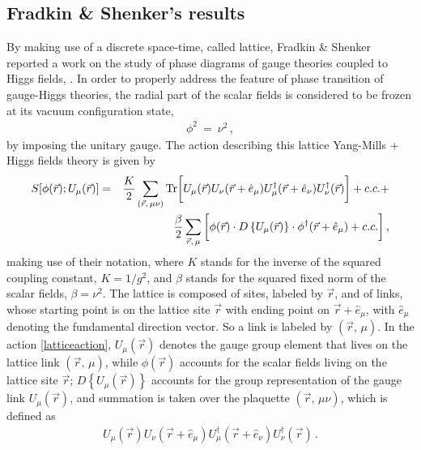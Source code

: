 \subsection{Fradkin \& Shenker's results}
\label{FSresults}


By making use of a discrete space-time, called lattice, Fradkin \& Shenker reported a work on
the study of phase diagrams of gauge theories coupled to Higgs fields, \cite{Fradkin:1978dv}.
%
In order to properly address the feature of phase transition of gauge-Higgs theories, the
radial part of the scalar fields is considered to be frozen at its vacuum configuration state,
\begin{eqnarray}
{\phi}^{2} ~=~ \nu^2\,,
\label{untgauge}
\end{eqnarray}
by imposing the unitary gauge. The action describing this lattice Yang-Mills + Higgs fields
theory is given by
\begin{eqnarray}
S[\phi(\vec{r});U_{\mu}(\vec{r})] &=& \frac{K}{2} \sum_{(\vec{r},\,\mu\nu)} \mathrm{Tr} \bigg[
U_{\mu}(\vec{r}) U_{\nu}(\vec{r} + \hat{e}_{\mu}) U^{\dagger}_{\mu}(\vec{r} + \hat{e}_{\nu})
U^{\dagger}_{\nu}(\vec{r}) \bigg] + c.c. +
\nonumber \\
&&
\frac{\beta}{2} \sum_{\vec{r},\,\mu} \bigg[ \phi(\vec{r})\cdot D\left\{ U_{\mu}(\vec{r})
\right\} \cdot \phi^{\dagger}(\vec{r} + \hat{e}_{\mu}) + c.c. \bigg]\,,
\label{latticeaction}
\end{eqnarray}
making use of their notation, where $K$ stands for the inverse of the squared coupling
constant, $K = 1/g^{2}$, and $\beta$ stands for the squared fixed norm of the
scalar fields, $\beta = \nu^{2}$. The lattice is composed of sites, labeled by $\vec{r}$, and
of links, whose starting point is on the lattice site $\vec{r}$ with ending point on $\vec{r} +
\hat{e}_{\mu}$, with $\hat{e}_{\mu}$ denoting the fundamental direction vector. So a link is
labeled by $(\vec{r},\,\mu)$. 
In the action \eqref{latticeaction}, $U_{\mu}(\vec{r})$ denotes the gauge group element that
lives on the lattice link $(\vec{r},\,\mu)$, while $\phi(\vec{r})$ accounts for the scalar
fields living on the lattice site $\vec{r}$; $D\left\{U_{\mu} (\vec{r})\right\}$ accounts for
the group representation of the gauge link $U_{\mu}(\vec{r})$, and summation is taken over the
plaquette $(\vec{r},\,\mu\nu)$, which is defined as
\begin{eqnarray}
U_{\mu}(\vec{r}) U_{\nu}(\vec{r} + \hat{e}_{\mu}) U^{\dagger}_{\mu}(\vec{r} + \hat{e}_{\nu})
U^{\dagger}_{\nu}(\vec{r})\,.
\end{eqnarray}

